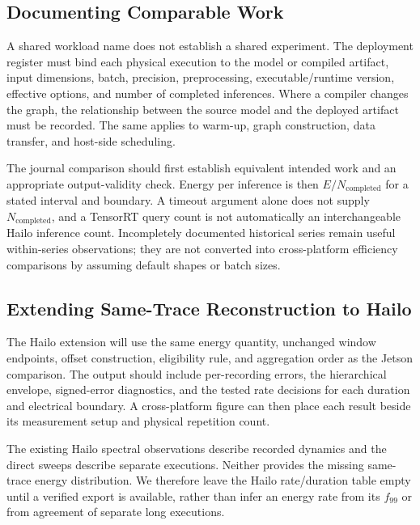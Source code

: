 \subsection{Documenting Comparable Work}
A shared workload name does not establish a shared experiment. The deployment register must bind each physical execution to the model or compiled artifact, input dimensions, batch, precision, preprocessing, executable/runtime version, effective options, and number of completed inferences. Where a compiler changes the graph, the relationship between the source model and the deployed artifact must be recorded. The same applies to warm-up, graph construction, data transfer, and host-side scheduling.

The journal comparison should first establish equivalent intended work and an appropriate output-validity check. Energy per inference is then $E/N_{\mathrm{completed}}$ for a stated interval and boundary. A timeout argument alone does not supply $N_{\mathrm{completed}}$, and a TensorRT query count is not automatically an interchangeable Hailo inference count. Incompletely documented historical series remain useful within-series observations; they are not converted into cross-platform efficiency comparisons by assuming default shapes or batch sizes.


\subsection{Extending Same-Trace Reconstruction to Hailo}
The Hailo extension will use the same energy quantity, unchanged window endpoints, offset construction, eligibility rule, and aggregation order as the Jetson comparison. The output should include per-recording errors, the hierarchical envelope, signed-error diagnostics, and the tested rate decisions for each duration and electrical boundary. A cross-platform figure can then place each result beside its measurement setup and physical repetition count.

The existing Hailo spectral observations describe recorded dynamics and the direct sweeps describe separate executions. Neither provides the missing same-trace energy distribution. We therefore leave the Hailo rate/duration table empty until a verified export is available, rather than infer an energy rate from its $f_{99}$ or from agreement of separate long executions.

